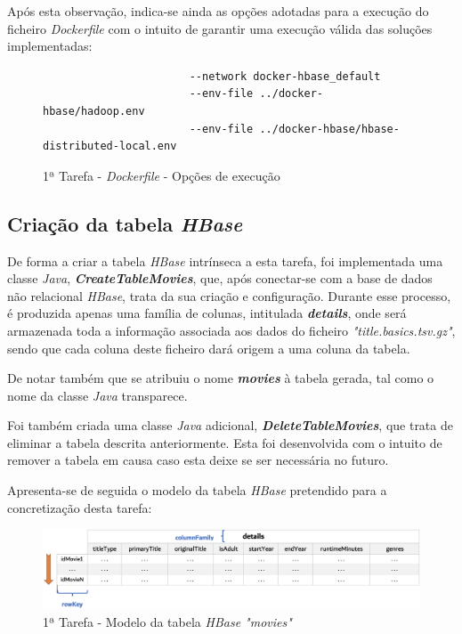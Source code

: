 \documentclass[a4paper]{report}
\begin{document}
{        Após esta observação, indica-se ainda as opções adotadas para a execução do ficheiro \textit{Dockerfile} com o intuito de garantir uma execução válida das soluções implementadas:
		\begin{figure}[H]
			{
				\color{teal}
				\begin{verbatim}
					   --network docker-hbase_default
					   --env-file ../docker-hbase/hadoop.env
					   --env-file ../docker-hbase/hbase-distributed-local.env
				\end{verbatim}
			}
			\caption{1ª Tarefa - \textit{Dockerfile} - Opções de execução}
			\label{fig:4}
        \end{figure}
		
		\subsection{Criação da tabela \textit{HBase}} \label{subsec:Task1-1}
		De forma a criar a tabela \textit{HBase} intrínseca a esta tarefa, foi implementada uma classe \textit{Java}, \textbf{\textit{CreateTableMovies}}, que, após conectar-se com a base de dados não relacional \textit{HBase}, trata da sua criação e configuração.
		Durante esse processo, é produzida apenas uma família de colunas, intitulada \textbf{\textit{details}}, onde será armazenada toda a informação associada aos dados do ficheiro \textit{"title.basics.tsv.gz"}, sendo que cada coluna deste ficheiro dará origem a uma coluna da tabela.

		De notar também que se atribuiu o nome \textbf{\textit{movies}} à tabela gerada, tal como o nome da classe \textit{Java} transparece.

		Foi também criada uma classe \textit{Java} adicional, \textbf{\textit{DeleteTableMovies}}, que trata de eliminar a tabela descrita anteriormente.
		Esta foi desenvolvida com o intuito de remover a tabela em causa caso esta deixe se ser necessária no futuro.
        
        Apresenta-se de seguida o modelo da tabela \textit{HBase} pretendido para a concretização desta tarefa:
        \begin{figure}[H]
            \centering
            \includegraphics[width=1.0\textwidth]{Images/Task 1 - HBase.png}
            \caption{1ª Tarefa - Modelo da tabela \textit{HBase "movies"}}
            \label{fig:5}
        \end{figure}

}
\end{document}
